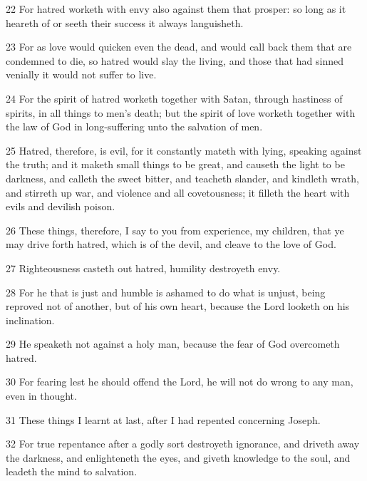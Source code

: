 \par 22 For hatred worketh with envy also against them that prosper: so long as it heareth of or seeth their success it always languisheth.

\par 23 For as love would quicken even the dead, and would call back them that are condemned to die, so hatred would slay the living, and those that had sinned venially it would not suffer to live.

\par 24 For the spirit of hatred worketh together with Satan, through hastiness of spirits, in all things to men's death; but the spirit of love worketh together with the law of God in long-suffering unto the salvation of men.

\par 25 Hatred, therefore, is evil, for it constantly mateth with lying, speaking against the truth; and it maketh small things to be great, and causeth the light to be darkness, and calleth the sweet bitter, and teacheth slander, and kindleth wrath, and stirreth up war, and violence and all covetousness; it filleth the heart with evils and devilish poison.

\par 26 These things, therefore, I say to you from experience, my children, that ye may drive forth hatred, which is of the devil, and cleave to the love of God.

\par 27 Righteousness casteth out hatred, humility destroyeth envy.

\par 28 For he that is just and humble is ashamed to do what is unjust, being reproved not of another, but of his own heart, because the Lord looketh on his inclination.

\par 29 He speaketh not against a holy man, because the fear of God overcometh hatred.

\par 30 For fearing lest he should offend the Lord, he will not do wrong to any man, even in thought.

\par 31 These things I learnt at last, after I had repented concerning Joseph.

\par 32 For true repentance after a godly sort destroyeth ignorance, and driveth away the darkness, and enlighteneth the eyes, and giveth knowledge to the soul, and leadeth the mind to salvation.


